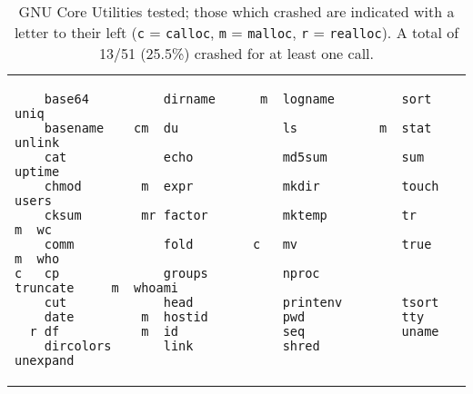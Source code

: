 \begin{table}[h]
\begin{tabular}{l}
\begin{lstlisting}
    base64          dirname      m  logname         sort            uniq
    basename    cm  du              ls           m  stat            unlink
    cat             echo            md5sum          sum             uptime
    chmod        m  expr            mkdir           touch           users
    cksum        mr factor          mktemp          tr           m  wc
    comm            fold        c   mv              true         m  who
c   cp              groups          nproc           truncate     m  whoami
    cut             head            printenv        tsort
    date         m  hostid          pwd             tty
  r df           m  id              seq             uname
    dircolors       link            shred           unexpand
\end{lstlisting}
\end{tabular}
\label{lst:coreutils}
\caption{GNU Core Utilities tested; those which crashed are indicated with a letter to their left (\texttt{c} = \texttt{calloc}, \texttt{m} = \texttt{malloc}, \texttt{r} = \texttt{realloc}). A total of 13/51 (25.5\%) crashed for at least one call.}
\end{table}
